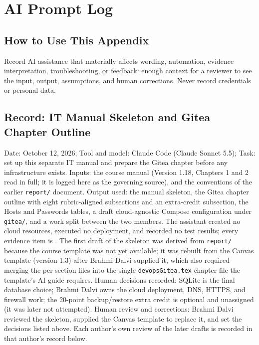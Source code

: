 \chapter{AI Prompt Log}
\section{How to Use This Appendix}
Record AI assistance that materially affects wording, automation, evidence
interpretation, troubleshooting, or feedback: enough context for a reviewer to
see the input, output, assumptions, and human corrections. Never record
credentials or personal data.

\section{Record: IT Manual Skeleton and Gitea Chapter Outline}
Date: October 12, 2026; Tool and model: Claude Code (Claude Sonnet 5.5);
Task: set up this separate IT manual and prepare the Gitea chapter before any
infrastructure exists. Inputs: the course manual \cite{DosManual} (Version
1.18, Chapters 1 and 2 read in full; it is logged here as the governing
source), and the conventions of the earlier \texttt{report/} document. Output
used: the manual skeleton, the Gitea chapter outline with eight rubric-aligned
subsections and an extra-credit subsection, the Hosts and Passwords tables,
a draft cloud-agnostic Compose configuration under \texttt{gitea/}, and a work
split between the two members. The assistant created no cloud resources,
executed no deployment, and recorded no test results; every evidence item is
\StatusPending. The first draft of the skeleton was derived from
\texttt{report/} because the course template was not yet available; it was
rebuilt from the Canvas template (version 1.3) after Brahmi Dalvi supplied it,
which also required merging the per-section files into the single
\texttt{devopsGitea.tex} chapter file the template's AI guide requires. Human
decisions recorded: SQLite is the final database choice; Brahmi Dalvi owns the
cloud deployment, DNS, HTTPS, and firewall work; the 20-point backup/restore
extra credit is optional and unassigned (it was later not attempted). Human
review and corrections: Brahmi Dalvi reviewed the skeleton, supplied the Canvas
template to replace it, and set the decisions listed above. Each author's own
review of the later drafts is recorded in that author's record below.

